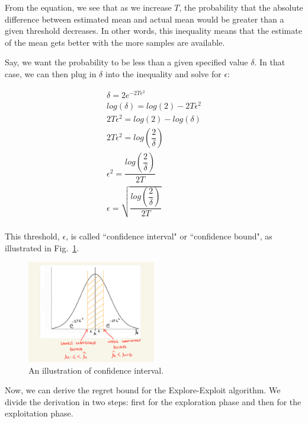\documentclass[11pt]{article}
\begin{document}
\normalfont

From the equation, we see that as we increase $T$, the probability that the absolute difference between estimated mean and actual mean would be greater than a given threshold decreases. In other words, this inequality means that the estimate of the mean gets better with the more samples are available. 





Say, we want the probability to be less than a given specified value $\delta$. In that case, we can then plug in $\delta$ into the inequality and solve for $\epsilon$:

\begin{align*}
    \delta = 2 e^{-2T\epsilon^2} \\
    log(\delta) = log(2) - 2T\epsilon^2 \\
     2T\epsilon^2 = log(2) - log(\delta) \\
     2T\epsilon^2 = log(\dfrac{2}{\delta}) \\
     \epsilon^2 = \dfrac{log(\dfrac{2}{\delta})}{2T} \\
     \epsilon = \sqrt{\dfrac{log(\dfrac{2}{\delta})}{2T}} \\
\end{align*}

This threshold, $\epsilon$, is called ``confidence interval" or ``confidence bound", as illustrated in Fig.~\ref{fig:confid}.
\begin{figure}[h!]
    \centering
    \includegraphics[width=0.5\textwidth]{IMG_3F1CB3131325-1.jpeg}
    \caption{An illustration of confidence interval.}
    \label{fig:confid}
\end{figure}


Now, we can derive the regret bound for the Explore-Exploit algorithm. We divide the derivation in two steps: first for the exploration phase
and then for the exploitation phase.
\end{document}
